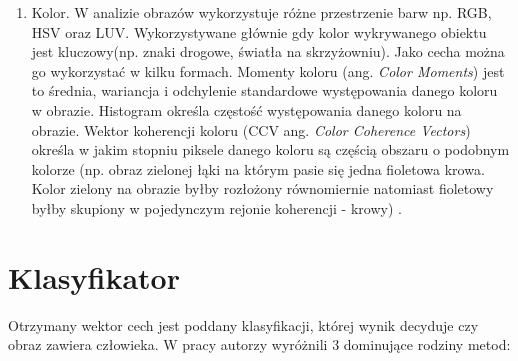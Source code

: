 \begin{enumerate}
\item Kolor. W analizie obrazów wykorzystuje różne przestrzenie barw np. RGB, HSV oraz LUV. Wykorzystywane głównie gdy kolor wykrywanego obiektu jest kluczowy(np. znaki drogowe, światła na skrzyżowniu). Jako cecha można go wykorzystać w kilku formach. Momenty koloru (ang. \textit{Color Moments}) jest to średnia, wariancja i odchylenie standardowe występowania danego koloru w obrazie. Histogram określa częstość występowania danego koloru na obrazie. Wektor koherencji koloru (CCV ang. \textit{ Color Coherence Vectors}) określa w jakim stopniu piksele danego koloru są częścią obszaru o podobnym kolorze (np. obraz zielonej łąki na którym pasie się jedna fioletowa krowa. Kolor zielony na obrazie byłby rozłożony równomiernie natomiast fioletowy byłby skupiony w pojedynczym rejonie koherencji - krowy) \cite{kodituwakku2004comparison}.

\end{enumerate}

\section{Klasyfikator}
Otrzymany wektor cech jest poddany klasyfikacji, której wynik decyduje czy obraz zawiera człowieka.
W pracy \cite{benenson2014ten} autorzy wyróżnili 3 dominujące rodziny metod:

